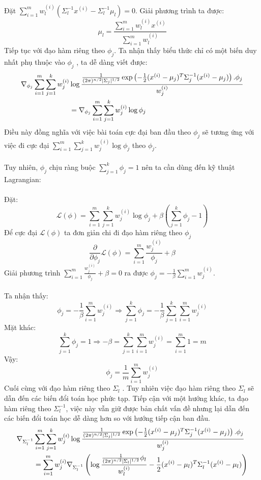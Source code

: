 Đặt $\sum_{i=1}^{m} w_{l}^{(i)} (\Sigma_l^{-1}
x^{(i)} - \Sigma_l^{-1} \mu_l) = 0$. Giải phương trình ta được:
\[ \mu_l = \frac{\sum_{i=1}^{m} w_l^{(i)} x^{(i)}}{\sum_{i=1}^{m} w_l^{(i)}} \]
Tiếp tục với đạo hàm riêng theo $\phi_j$. Ta nhận thấy biểu thức chỉ có một biến
duy nhất phụ thuộc vào $\phi_j$ , ta dễ dàng viết được:
\begin{align} \nabla_{\phi_j} \sum_{i=1}^{m} \sum_{j=1}^{k} w_{j}^{(i)} & \log
\frac{\frac{1}{(2\pi)^{n/2}|\Sigma_j|^{1/2}}\exp\left( -\frac{1}{2}
(x^{(i)}-\mu_j)^T \Sigma_j^{-1} (x^{(i)}-\mu_j)
\right).\phi_j}{w_{j}^{(i)}}\notag\\
& =  \nabla_{\phi_j} \sum_{i=1}^{m} \sum_{j=1}^{k} w_{j}^{(i)} \log \phi_j\notag
\end{align}
Điều này đồng nghĩa với việc bài toán cực đại ban đầu theo $\phi_j$ sẽ tương ứng
với việc đi cực đại $\sum_{i=1}^{m} \sum_{j=1}^{k} w_{j}^{(i)} \log \phi_j$ theo
$\phi_j$.\\\\
Tuy nhiên, $\phi_j$ chịu ràng buộc $\sum_{j=1}^{k} \phi_j=1$ nên ta cần dùng đến
kỹ thuật Lagrangian:\\\\
Đặt:
\[ \mathcal{L}(\phi)= \sum_{i=1}^{m} \sum_{j=1}^{k} w_{j}^{(i)} \log \phi_j +
\beta \left( \sum_{j=1}^{k} \phi_j-1 \right) \]
Để cực đại $\mathcal{L}(\phi)$ ta đơn giản chi đi đạo hàm riêng theo $\phi_j$
\[ \frac{\partial}{\partial\phi_j}\mathcal{L}(\phi)= \sum_{i=1}^m
\frac{w_j^{(i)}}{\phi_j} + \beta \]
Giải phương trình $\sum_{i=1}^m \frac{w_j^{(i)}}{\phi_j}
+ \beta = 0$ ra được $\phi_j = -\frac{1}{\beta}\sum_{i=1}^m w_j^{(i)}$.\\\\
Ta nhận thấy:
\[ \phi_j = -\frac{1}{\beta}\sum_{i=1}^m w_j^{(i)} \Rightarrow \sum_{j=1}^{k}
\phi_j = -\frac{1}{\beta} \sum_{j=1}^{k} \sum_{i=1}^m w_j^{(i)} \]
Mặt khác:
\[ \sum_{j=1}^{k} \phi_j = 1 \Rightarrow -\beta = \sum_{j=1}^{k}
\sum_{i=1}^m w_j^{(i)} = \sum_{i=1}^m 1 = m \]
Vậy:
\[ \phi_j = \frac{1}{m} \sum_{i=1}^m w_j^{(i)} \]
Cuối cùng với đạo hàm riêng theo $\Sigma_l$ . Tuy nhiên việc đạo hàm riêng theo
$\Sigma_l$ sẽ dẫn đến các biến đổi toán học phức tạp. Tiếp cận với một hướng khác, ta đạo hàm riêng
theo $\Sigma_l^{-1}$, việc này vẫn giữ được bản chất vấn đề nhưng lại dẫn đến các
biến đổi toán học dễ dàng hơn so với hướng tiếp cận ban đầu.
\begin{align}
\nabla_{\Sigma_l^{-1}} & \sum_{i=1}^{m} \sum_{j=1}^{k} w_{j}^{(i)} \log
\frac{\frac{1}{(2\pi)^{n/2}|\Sigma_j|^{1/2}}\exp\left( -\frac{1}{2}
(x^{(i)}-\mu_j)^T \Sigma_j^{-1} (x^{(i)}-\mu_j)
\right).\phi_j}{w_{j}^{(i)}}\notag\\
& = \sum_{i=1}^{m} w_{j}^{(i)} \nabla_{\Sigma_l^{-1}} \left( \log
\frac{\frac{1}{(2\pi)^{n/2}|\Sigma_l|^{1/2}}\phi_l }{w_{l}^{(i)}} -\frac{1}{2}
(x^{(i)}-\mu_l)^T \Sigma_l^{-1} (x^{(i)}-\mu_l) \right)\notag
\end{align}
